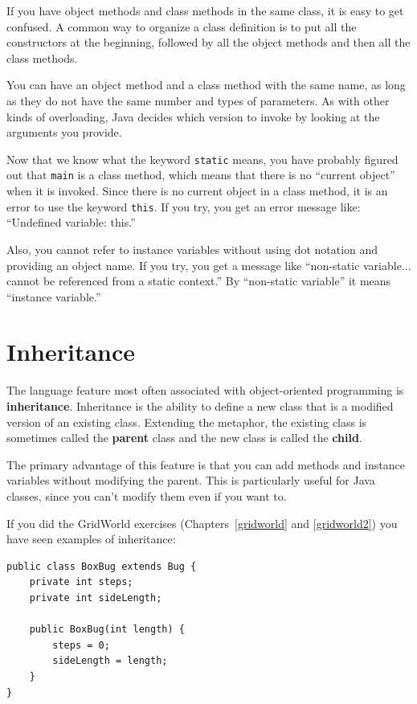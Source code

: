 \documentclass[12pt]{book}
\theoremstyle{exercise}
\begin{document}
If you have object methods and class methods in the same class, it is
easy to get confused.  A common way to organize a class definition is
to put all the constructors at the beginning, followed by all the
object methods and then all the class methods.

You can have an object method and a class method with the same
name, as long as they do not have the same number and types of
parameters.  As with other kinds of overloading, Java decides
which version to invoke by looking at the arguments you provide.

Now that we know what the keyword {\tt static} means, you
have probably figured out that {\tt main} is a class method,
which means that there is no ``current object'' when it is invoked.
%
Since there is no current object in a class method, it is an
error to use the keyword {\tt this}.  If you try, you get
an error message like: ``Undefined variable: this.''

Also, you cannot refer to instance variables without using dot
notation and providing an object name.  If you try, you get a message
like ``non-static variable... cannot be referenced from a static
context.''  By ``non-static variable'' it means ``instance variable.''


\section{Inheritance}

The language feature most often associated with
object-oriented programming is {\bf inheritance}.  Inheritance is the
ability to define a new class that is a modified version of an
existing class.
%
Extending the metaphor, the existing
class is sometimes called the {\bf parent} class and the new
class is called the {\bf child}.

The primary advantage of this feature is that you can add methods
and instance variables without modifying the
parent.  This is particularly useful for Java classes,
since you can't modify them even if you want to.

If you did the GridWorld exercises (Chapters~\ref{gridworld} and
\ref{gridworld2}) you have seen examples of inheritance:

\begin{lstlisting}
public class BoxBug extends Bug {
    private int steps;
    private int sideLength;

    public BoxBug(int length) {
        steps = 0;
        sideLength = length;
    }
}
\end{lstlisting}
\end{document}
